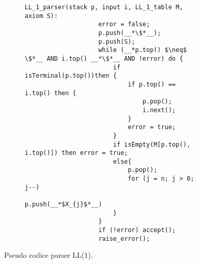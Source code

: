 \documentclass{subfiles}
\begin{document}
\begin{figure}[h!]
    \centering
    \begin{subfigure}[b]{0.75\textwidth}
        \begin{lstlisting}[language = PSEUDO]
                LL_1_parser(stack p, input i, LL_1_table M, axiom S):
                    error = false;
                    p.push(__*\$*__);
                    p.push(S);
                    while (__*p.top() $\neq$ \$*__ AND i.top() __*\$*__ AND !error) do {
                        if isTerminal(p.top())then {
                            if p.top() == i.top() then {
                                p.pop();
                                i.next();
                            }
                            error = true;
                        }
                        if isEmpty(M[p.top(), i.top()]) then error = true;
                        else{
                            p.pop();
                            for (j = n; j > 0; j--)
                                p.push(__*$X_{j}$*__)
                        }
                    }
                    if (!error) accept();
                    raise_error();
            \end{lstlisting}
    \end{subfigure}
    \caption{Pseudo codice parser LL(1).}
    \label{fig:5}
\end{figure}
\end{document}
